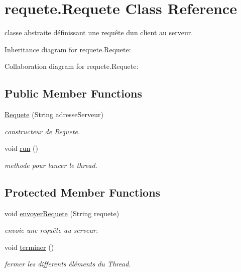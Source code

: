 \hypertarget{classrequete_1_1Requete}{}\section{requete.\+Requete Class Reference}
\label{classrequete_1_1Requete}


classe abstraite définissant une requête d\textquotesingle{}un client au serveur.  




Inheritance diagram for requete.\+Requete\+:


Collaboration diagram for requete.\+Requete\+:
\subsection*{Public Member Functions}
\begin{DoxyCompactItemize}
\item 
\hyperlink{classrequete_1_1Requete_a6ed8eefb9335b37f2348f5c323a46b53}{Requete} (String adresse\+Serveur)
\begin{DoxyCompactList}\small\item\em constructeur de \hyperlink{classrequete_1_1Requete}{Requete}. \end{DoxyCompactList}\item 
\mbox{\label{classrequete_1_1Requete_a919081397ea25302286d7077e3ece323}} 
void \hyperlink{classrequete_1_1Requete_a919081397ea25302286d7077e3ece323}{run} ()
\begin{DoxyCompactList}\small\item\em methode pour lancer le thread. \end{DoxyCompactList}\end{DoxyCompactItemize}
\subsection*{Protected Member Functions}
\begin{DoxyCompactItemize}
\item 
void \hyperlink{classrequete_1_1Requete_a4adc60edaa26be2f8d9b4e4b0a1377cd}{envoyer\+Requete} (String requete)
\begin{DoxyCompactList}\small\item\em envoie une requête au serveur. \end{DoxyCompactList}\item 
\mbox{\label{classrequete_1_1Requete_a139183d42763866d351b3569c858b169}} 
void \hyperlink{classrequete_1_1Requete_a139183d42763866d351b3569c858b169}{terminer} ()
\begin{DoxyCompactList}\small\item\em fermer les differents éléments du Thread. \end{DoxyCompactList}\end{DoxyCompactItemize}
